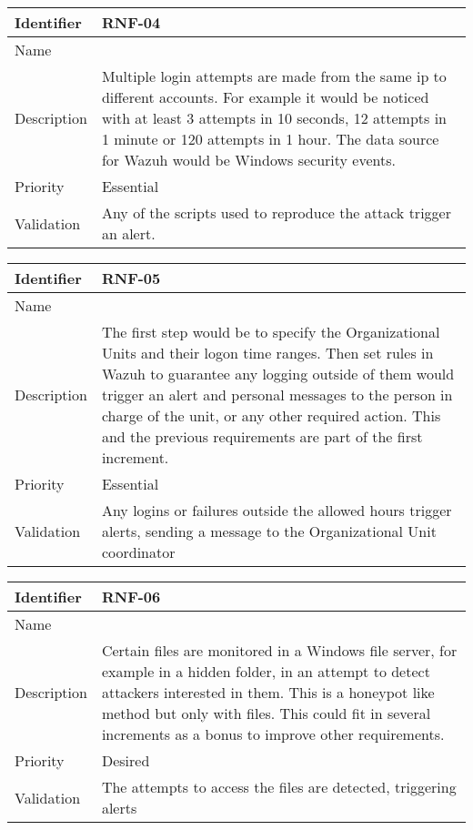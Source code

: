 \begin{table}[H]
	\begin{tabularx}{\textwidth}{|l|X|}
		\hline
		\rowcolor{gray!30}
		Identifier & \textbf{RNF-04} \\ \hline
		Name & \RNFcuatro \\ \hline
		Description & Multiple login attempts are made from the same ip to different accounts. For example it would be noticed with at least 3 attempts in 10 seconds, 12 attempts in 1 minute or 120 attempts in 1 hour. The data source for Wazuh would be Windows security events. \\ \hline
		Priority & Essential \\ \hline
		Validation & Any of the scripts used to reproduce the attack trigger an alert. \\ \hline
	\end{tabularx}
\end{table}
\begin{table}[H]
	\begin{tabularx}{\textwidth}{|l|X|}
		\hline
		\rowcolor{gray!30}
		Identifier & \textbf{RNF-05} \\ \hline
		Name & \RNFcinco \\ \hline
		Description & The first step would be to specify the Organizational Units and their logon time ranges. Then set rules in Wazuh to guarantee any logging outside of them would trigger an alert and personal messages to the person in charge of the unit, or any other required action. \linej This and the previous requirements are part of the first increment.  \\ \hline
		Priority & Essential \\ \hline
		Validation & Any logins or failures outside the allowed hours trigger alerts, sending a message to the Organizational Unit coordinator  \\ \hline
	\end{tabularx}
\end{table}
\begin{table}[H]
	\begin{tabularx}{\textwidth}{|l|X|}
		\hline
		\rowcolor{gray!30}
		Identifier & \textbf{RNF-06} \\ \hline
		Name & \RNFseis \\ \hline
		Description & Certain files are monitored in a Windows file server, for example in a hidden folder, in an attempt to detect attackers interested in them. This is a honeypot like method but only with files. This could fit in several increments as a bonus to improve other requirements.  \\ \hline
		Priority & Desired \\ \hline
		Validation & The attempts to access the files are detected, triggering alerts \\ \hline
	\end{tabularx}
\end{table}
